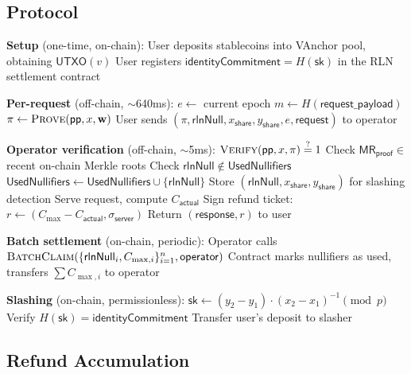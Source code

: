 \documentclass[11pt,a4paper]{article}
\theoremstyle{definition}
\begin{document}
\subsection{Protocol}

\begin{algorithm}[H]
\caption{RLN Mode: Per-Request Unlinkable Payment}
\begin{algorithmic}[1]
\Statex \textbf{Setup} (one-time, on-chain):
\State User deposits stablecoins into VAnchor pool, obtaining $\mathsf{UTXO}(v)$
\State User registers $\mathsf{identityCommitment} = H(\mathsf{sk})$ in the RLN settlement contract

\Statex
\Statex \textbf{Per-request} (off-chain, $\sim$640ms):
\State $e \gets$ current epoch
\State $m \gets H(\mathsf{request\_payload})$
\State $\pi \gets \textsc{Prove}(\mathsf{pp}, x, \mathbf{w})$ 
\State User sends $(\pi, \mathsf{rlnNull}, x_{\mathsf{share}}, y_{\mathsf{share}}, e, \mathsf{request})$ to operator

\Statex
\Statex \textbf{Operator verification} (off-chain, $\sim$5ms):
\State $\textsc{Verify}(\mathsf{pp}, x, \pi) \stackrel{?}{=} 1$
\State Check $\mathsf{MR}_{\mathsf{proof}} \in$ recent on-chain Merkle roots
\State Check $\mathsf{rlnNull} \notin \mathsf{UsedNullifiers}$
\State $\mathsf{UsedNullifiers} \gets \mathsf{UsedNullifiers} \cup \{\mathsf{rlnNull}\}$
\State Store $(\mathsf{rlnNull}, x_{\mathsf{share}}, y_{\mathsf{share}})$ for slashing detection
\State Serve request, compute $C_{\mathsf{actual}}$
\State Sign refund ticket: $r \gets (C_{\max} - C_{\mathsf{actual}}, \sigma_{\mathsf{server}})$
\State Return $(\mathsf{response}, r)$ to user

\Statex
\Statex \textbf{Batch settlement} (on-chain, periodic):
\State Operator calls $\textsc{BatchClaim}(\{\mathsf{rlnNull}_i, C_{\max,i}\}_{i=1}^n, \mathsf{operator})$
\State Contract marks nullifiers as used, transfers $\sum C_{\max,i}$ to operator

\Statex
\Statex \textbf{Slashing} (on-chain, permissionless):
  \State $\mathsf{sk} \gets (y_2 - y_1) \cdot (x_2 - x_1)^{-1} \pmod{p}$
  \State Verify $H(\mathsf{sk}) = \mathsf{identityCommitment}$
  \State Transfer user's deposit to slasher
\EndIf
\end{algorithmic}
\end{algorithm}

\subsection{Refund Accumulation}
\end{document}

